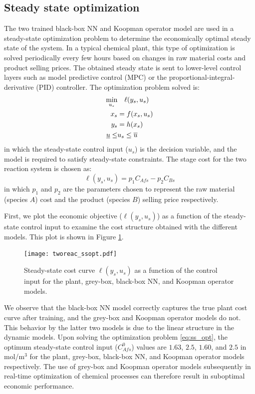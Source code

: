 \documentclass[10pt]{article}
\begin{document}
\subsection{Steady state optimization}
The two trained black-box NN and Koopman operator model are used in a
steady-state optimization problem to determine the economically optimal steady
state of the system. In a typical chemical plant, this type of optimization is
solved periodically every few hours based on changes in raw material costs and
product selling prices. The obtained steady state is sent to lower-level control
layers such as model predictive control (MPC) or the
proportional-integral-derivative (PID) controller. The optimization problem
solved is:
\begin{align} \label{eq:ss_opt}
  \underset{u_s}{\textnormal{min}} & \quad \ell(y_s, u_s) \\
  x_s &= f(x_s, u_s) \nonumber \\ 
  y_s &= h(x_s) \nonumber \\
  \underline{u} \leq &u_s \leq \overline{u} \nonumber
\end{align}
in which the steady-state control input ($u_s$) is the decision variable,  and
the model is required to satisfy steady-state constraints. The stage cost for
the two reaction system is chosen as:
\begin{equation*}
  \ell(y_s, u_s) = p_1C_{Afs} - p_2C_{Bs}
\end{equation*}
in which $p_1$ and $p_2$ are the parameters chosen to represent the raw material
(species $A$) cost and the product (species $B$) selling price respectively. 

First, we plot the economic objective ($\ell(y_s, u_s)$) as a function of the
steady-state control input to examine the cost structure obtained with the
different models. This plot is shown in Figure \ref{fig:tworeac_sscost}.

\begin{figure}[!h]
  \centering
  \texttt{[image: tworeac\_ssopt.pdf]}
  \caption{Steady-state cost curve $\ell(y_s, u_s)$ as a function of the control input for the plant, grey-box, black-box NN, and Koopman operator models.}
  \label{fig:tworeac_sscost}
\end{figure}

We observe that the black-box NN model correctly captures the true plant cost
curve after training, and the grey-box and Koopman operator models do not. This
behavior by the latter two models is due to the linear structure in the dynamic
models. Upon solving the optimization problem \eqref{eq:ss_opt}, the optimum
steady-state control input ($C_{Afs}^0$) values are $1.63$, $2.5$, $1.60$, and
$2.5$ in mol/m$^3$ for the plant, grey-box, black-box NN, and Koopman operator
models respectively. The use of grey-box and Koopman operator models
subsequently in real-time optimization of chemical processes can therefore
result in suboptimal economic performance.
\end{document}
